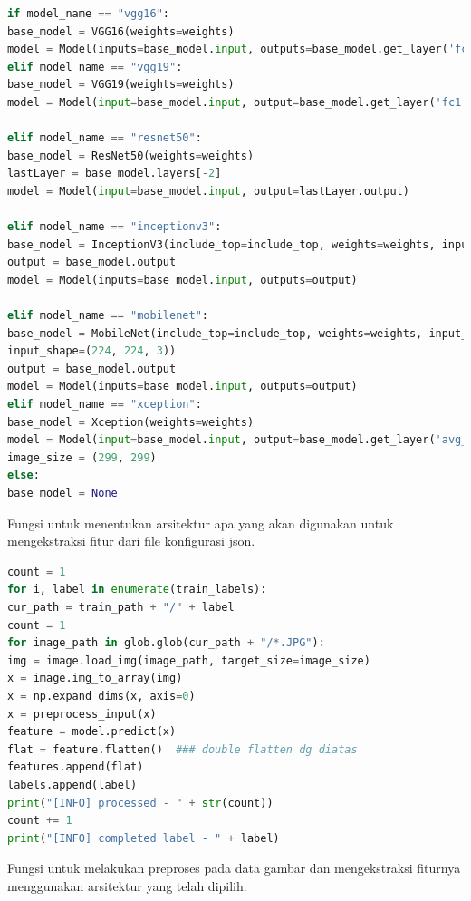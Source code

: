 \begin{lstlisting}[language=python, caption=Menentukan arsitektur untuk ekstraksi fitur, label=code:choose_architecture, firstnumber=58]
if model_name == "vgg16":
base_model = VGG16(weights=weights)
model = Model(inputs=base_model.input, outputs=base_model.get_layer('fc1').output)
elif model_name == "vgg19":
base_model = VGG19(weights=weights)
model = Model(input=base_model.input, output=base_model.get_layer('fc1').output)

elif model_name == "resnet50":
base_model = ResNet50(weights=weights)
lastLayer = base_model.layers[-2]
model = Model(input=base_model.input, output=lastLayer.output) 

elif model_name == "inceptionv3":
base_model = InceptionV3(include_top=include_top, weights=weights, input_tensor=Input(shape=(299, 299, 3)))
output = base_model.output
model = Model(inputs=base_model.input, outputs=output)

elif model_name == "mobilenet":
base_model = MobileNet(include_top=include_top, weights=weights, input_tensor=Input(shape=(224, 224, 3)),
input_shape=(224, 224, 3))
output = base_model.output
model = Model(inputs=base_model.input, outputs=output)
elif model_name == "xception":
base_model = Xception(weights=weights)
model = Model(input=base_model.input, output=base_model.get_layer('avg_pool').output)
image_size = (299, 299)
else:
base_model = None
\end{lstlisting}
\par Fungsi untuk menentukan arsitektur apa yang akan digunakan untuk mengekstraksi fitur dari file konfigurasi json.

\begin{lstlisting}[language=python, caption=Preproses Data, label=code:preprocess, firstnumber=123]
count = 1
for i, label in enumerate(train_labels):
cur_path = train_path + "/" + label
count = 1
for image_path in glob.glob(cur_path + "/*.JPG"):
img = image.load_img(image_path, target_size=image_size)
x = image.img_to_array(img)
x = np.expand_dims(x, axis=0)
x = preprocess_input(x)
feature = model.predict(x)
flat = feature.flatten()  ### double flatten dg diatas
features.append(flat)
labels.append(label)
print("[INFO] processed - " + str(count))
count += 1
print("[INFO] completed label - " + label)
\end{lstlisting} 

\par Fungsi untuk melakukan preproses pada data gambar dan mengekstraksi fiturnya menggunakan arsitektur yang telah dipilih.

